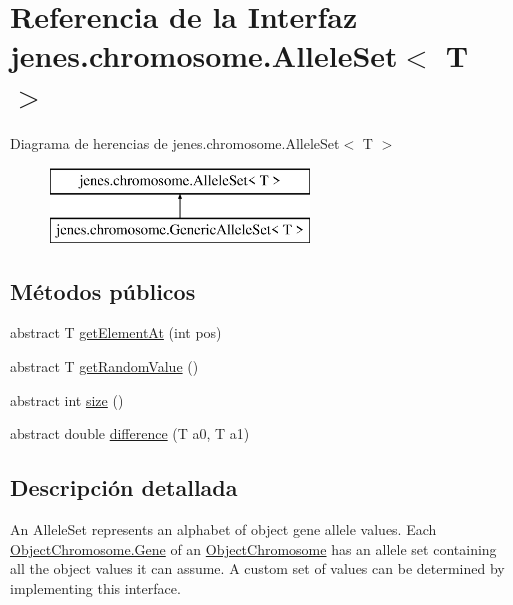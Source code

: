 \hypertarget{interfacejenes_1_1chromosome_1_1_allele_set_3_01_t_01_4}{\section{Referencia de la Interfaz jenes.\-chromosome.\-Allele\-Set$<$ T $>$}
\label{interfacejenes_1_1chromosome_1_1_allele_set_3_01_t_01_4}
}
Diagrama de herencias de jenes.\-chromosome.\-Allele\-Set$<$ T $>$\begin{figure}[H]
\begin{center}
\leavevmode
\includegraphics[height=2.000000cm]{interfacejenes_1_1chromosome_1_1_allele_set_3_01_t_01_4}
\end{center}
\end{figure}
\subsection*{Métodos públicos}
\begin{DoxyCompactItemize}
\item 
abstract T \hyperlink{interfacejenes_1_1chromosome_1_1_allele_set_3_01_t_01_4_a10625403643dc57a5c655a92a49aa644}{get\-Element\-At} (int pos)
\item 
abstract T \hyperlink{interfacejenes_1_1chromosome_1_1_allele_set_3_01_t_01_4_ac09d409c55d941892df658d21b3d4bff}{get\-Random\-Value} ()
\item 
abstract int \hyperlink{interfacejenes_1_1chromosome_1_1_allele_set_3_01_t_01_4_a3acbb10df92ebafc589d5d8546949f2f}{size} ()
\item 
abstract double \hyperlink{interfacejenes_1_1chromosome_1_1_allele_set_3_01_t_01_4_a74ab0cb120fcfdee8e878727d6c50815}{difference} (T a0, T a1)
\end{DoxyCompactItemize}


\subsection{Descripción detallada}
An Allele\-Set represents an alphabet of object gene allele values. Each \hyperlink{}{Object\-Chromosome.\-Gene} of an \hyperlink{classjenes_1_1chromosome_1_1_object_chromosome}{Object\-Chromosome} has an allele set containing all the object values it can assume. A custom set of values can be determined by implementing this interface.


